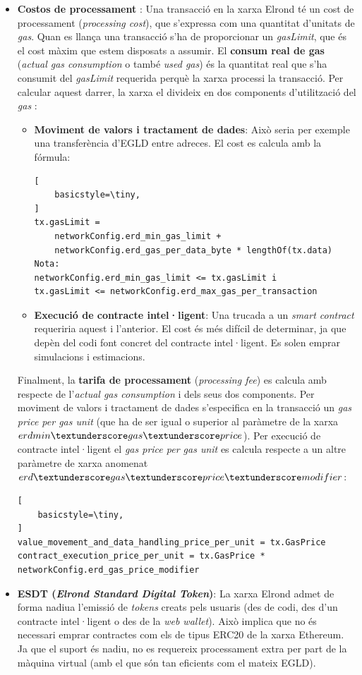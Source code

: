 \documentclass[11pt,a4paper]{article}
\begin{document}
\begin{itemize}
\item \textbf{Costos de processament} \cite{elrond2022}:
Una transacció en la xarxa Elrond té un cost de processament (\textit{processing cost}), que s'expressa com una quantitat d'unitats de \textit{gas}. Quan es llança una transacció s'ha de proporcionar un \textit{gasLimit}, que és el cost màxim que estem disposats a assumir. El \textbf{consum real de gas} (\textit{actual gas consumption} o també \textit{used gas}) és la quantitat real que s'ha consumit del \textit{gasLimit} requerida perquè la xarxa processi la transacció. Per calcular aquest darrer, la xarxa el divideix en dos components d'utilització del \textit{gas} \cite{elrond2022}:
\begin{itemize}
\item \textbf{Moviment de valors i tractament de dades}: Això seria per exemple una transferència d'EGLD entre adreces. El cost es calcula amb la fórmula:
\begin{lstlisting}[
    basicstyle=\tiny,
]
tx.gasLimit = 
    networkConfig.erd_min_gas_limit + 
    networkConfig.erd_gas_per_data_byte * lengthOf(tx.data)
Nota:
networkConfig.erd_min_gas_limit <= tx.gasLimit i
tx.gasLimit <= networkConfig.erd_max_gas_per_transaction
\end{lstlisting}
\item \textbf{Execució de contracte intel·ligent}: Una trucada a un \textit{smart contract} requeriria aquest i l'anterior. El cost és més difícil de determinar, ja que depèn del codi font concret del contracte intel·ligent. Es solen emprar simulacions i estimacions.
\end{itemize}
Finalment, la \textbf{tarifa de processament} (\textit{processing fee}) es calcula amb respecte de l'\textit{actual gas consumption} i dels seus dos components. Per moviment de valors i tractament de dades s'especifica en la transacció un \textit{gas price per gas unit} (que ha de ser igual o superior al paràmetre de la xarxa \(erdmin\textunderscore  gas\textunderscore price\)). Per execució de contracte intel·ligent el \textit{gas price per gas unit} es calcula respecte a un altre paràmetre de xarxa anomenat \(erd\textunderscore gas\textunderscore price\textunderscore modifier\):
\begin{lstlisting}[
    basicstyle=\tiny,
]
value_movement_and_data_handling_price_per_unit = tx.GasPrice
contract_execution_price_per_unit = tx.GasPrice * networkConfig.erd_gas_price_modifier
\end{lstlisting}

\item \textbf{ESDT (\textit{Elrond Standard Digital Token})}: La xarxa Elrond admet de forma nadiua l'emissió de \textit{tokens} creats pels usuaris (des de codi, des d'un contracte intel·ligent o des de la \textit{web wallet}). Això implica que no és necessari emprar contractes com els de tipus ERC20 de la xarxa Ethereum. Ja que el suport és nadiu, no es requereix processament extra per part de la màquina virtual (amb el que són tan eficients com el mateix EGLD).


\end{itemize}
\end{document}
